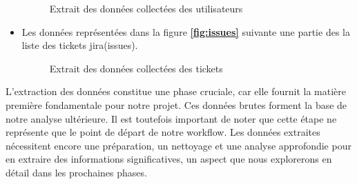 \begin{itemize}
\begin{figure}[H]
             \begin{minipage}{1\linewidth}
                \centering
                \caption{Extrait des données collectées des utilisateurs}
                \label{fig:users}

            \end{minipage}\hfill 
            \begin{minipage}{1\linewidth}
                \centering
                
            \end{minipage}
             \label{fig:login}
        \end{figure}
        \item  Les données représentées dans la figure \textbf{\ref{fig:issues}} suivante une partie des la liste des tickets jira(issues).
        \begin{figure}[H]
            
             \begin{minipage}{1\linewidth}
                \centering
                \caption{Extrait des données collectées des tickets}
                \label{fig:issues}

            \end{minipage}\hfill 
            \begin{minipage}{1\linewidth}
                \centering
                
            \end{minipage}
             \label{fig:login}
        \end{figure}
    \end{itemize}
        \par L'extraction des données constitue une phase cruciale, car elle fournit la matière première fondamentale pour notre projet. Ces données brutes forment la base de notre analyse ultérieure. Il est toutefois important de noter que cette étape ne représente que le point de départ de notre workflow. Les données extraites nécessitent encore une préparation, un nettoyage et une analyse approfondie pour en extraire des informations significatives, un aspect que nous explorerons en détail dans les prochaines phases.
